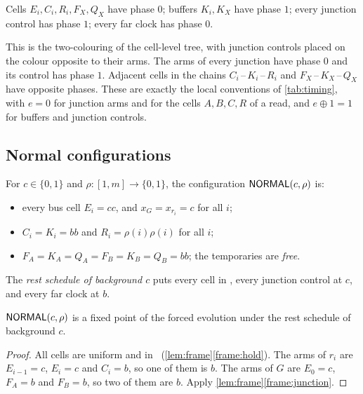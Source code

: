 \begin{definition}\label{def:procphases}
Cells $E_i,C_i,R_i,F_X,Q_X$ have phase $0$; buffers $K_i,K_X$ have phase $1$; every junction control
has phase $1$; every far clock has phase $0$.
\end{definition}

This is the two-colouring of the cell-level tree, with junction controls placed on the colour
opposite to their arms. The arms of every junction have phase $0$ and its control has phase $1$.
Adjacent cells in the chains $C_i\,$--$\,K_i\,$--$\,R_i$ and $F_X\,$--$\,K_X\,$--$\,Q_X$ have opposite
phases. These are exactly the local conventions of \cref{tab:timing}, with $e=0$ for junction arms
and for the cells $A,B,C,R$ of a read, and $e\oplus1=1$ for buffers and junction controls.

\subsection{Normal configurations}

\begin{definition}\label{def:normal}
For $c\in\{0,1\}$ and $\rho:[1,m]\to\{0,1\}$, the configuration $\textsf{NORMAL}(c,\rho)$ is:
\begin{itemize}
\item every bus cell $E_i=cc$, and $x_G=x_{r_i}=c$ for all $i$;
\item $C_i=K_i=bb$ and $R_i=\rho(i)\rho(i)$ for all $i$;
\item $F_A=K_A=Q_A=F_B=K_B=Q_B=bb$; the temporaries are \emph{free}.
\end{itemize}
The \emph{rest schedule of background $c$} puts every cell in \HOLD, every junction control at $c$,
and every far clock at $b$.
\end{definition}

\begin{lemma}[Stability]\label{lem:normalstable}
$\textsf{NORMAL}(c,\rho)$ is a fixed point of the forced evolution under the rest schedule of background $c$.
\end{lemma}

\begin{proof}
All cells are uniform and in \HOLD\ (\cref{lem:frame}\ref{frame:hold}). The arms of $r_i$ are
$E_{i-1}=c$, $E_i=c$ and $C_i=b$, so one of them is $b$. The arms of $G$ are $E_0=c$, $F_A=b$ and
$F_B=b$, so two of them are $b$. Apply \cref{lem:frame}\ref{frame:junction}.
\end{proof}

